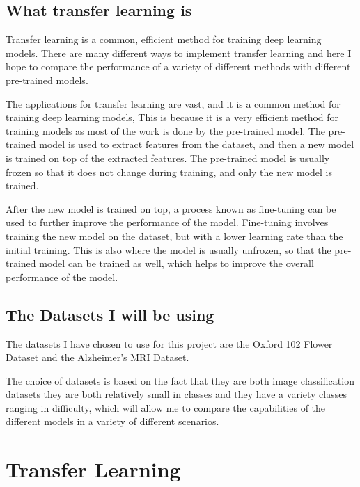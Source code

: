 \documentclass[]{final_report}
\begin{document}


\section{What transfer learning is}
Transfer learning is a common, efficient method for training deep learning models.
There are many different ways to implement transfer learning and here I hope to compare the performance
of a variety of different methods with different pre-trained models.

The applications for transfer learning are vast, and it is a common method for training deep learning models,
This is because it is a very efficient method for training models as most of the work is done by the pre-trained model.
The pre-trained model is used to extract features from the dataset, and then a new model is trained on top of the extracted features.
The pre-trained model is usually frozen so that it does not change during training, and only the new model is trained.

After the new model is trained on top, a process known as fine-tuning can be used to further improve the performance of the model.
Fine-tuning involves training the new model on the dataset, but with a lower learning rate than the initial training.
This is also where the model is usually unfrozen, so that the pre-trained model can be trained as well, which helps to improve the overall performance of the model.

\section{The Datasets I will be using}
The datasets I have chosen to use for this project are the Oxford 102 Flower Dataset\cite{OxfordFlowers102} and the Alzheimer's MRI Dataset\cite{AlzheimersDataset}.

The choice of datasets is based on the fact that they are both image classification datasets they are both relatively small in classes and
they have a variety classes ranging in difficulty, which will allow me to compare the capabilities of the different models in a variety of different scenarios.

\chapter{Transfer Learning}
\end{document}
